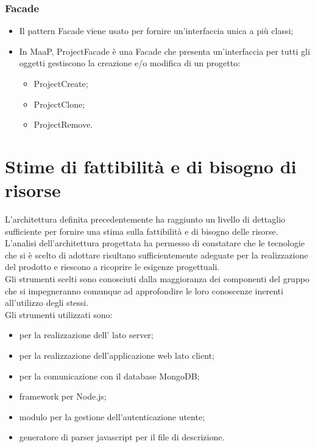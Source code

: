 \subsubsection{Facade}
\begin{itemize}
\item {} Il pattern Facade viene usato per fornire un'interfaccia unica a più classi;
\item {} In MaaP, ProjectFacade è una Facade che presenta un'interfaccia per tutti gli oggetti gestiscono la creazione e/o modifica di un progetto:\\
\begin{itemize}
\item ProjectCreate;
\item ProjectClone;
\item ProjectRemove.
\end{itemize}
\end{itemize}

\newpage
\section{Stime di fattibilità e di bisogno di risorse}
L'architettura definita precedentemente ha raggiunto un livello di dettaglio sufficiente per fornire una stima sulla fattibilità e di bisogno delle risorse.\\
L'analisi dell'architettura progettata ha permesso di constatare che le tecnologie che si è scelto di adottare risultano sufficientemente adeguate per la realizzazione del prodotto e riescono a ricoprire le esigenze progettuali.\\
Gli strumenti scelti sono conosciuti dalla maggioranza dei componenti del gruppo che si impegneranno comunque ad approfondire le loro conoscenze inerenti all'utilizzo degli stessi.\\
Gli strumenti utilizzati sono:
\begin{itemize}
\item {} per la realizzazione dell' lato server;
\item {} per la realizzazione dell'applicazione web lato client;
\item {} per la comunicazione con il database MongoDB;
\item {} framework per Node.js;
\item {} modulo per la gestione dell'autenticazione utente;
\item {} generatore di parser javascript per il file di descrizione.
\end{itemize}

